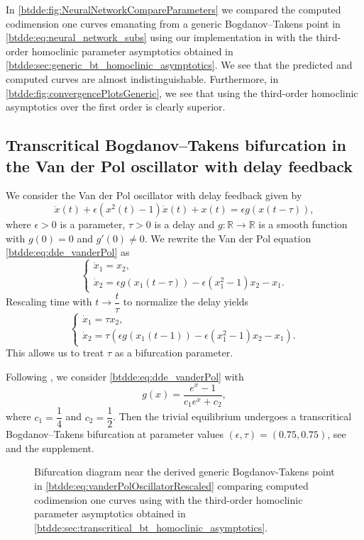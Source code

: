 In \cref{btdde:fig:NeuralNetworkCompareParameters} we compared the computed
codimension one curves emanating from a generic Bogdanov--Takens point in
\cref{btdde:eq:neural_network_subs} using our implementation in \DDEBIFTOOL with the
third-order homoclinic parameter asymptotics obtained in
\cref{btdde:sec:generic_bt_homoclinic_asymptotics}. We see that the predicted and
computed curves are almost indistinguishable. Furthermore, in
\cref{btdde:fig:convergencePlotsGeneric}, we see that using the third-order homoclinic
asymptotics over the first order is clearly superior.

\subsection{Transcritical Bogdanov--Takens bifurcation in the Van der Pol oscillator with delay feedback}
We consider the Van der Pol oscillator with delay feedback \cite{jiang2007bogdanov}
given by 
\begin{equation}
\label{btdde:eq:dde_vanderPol}
\ddot{x}(t) + \epsilon(x^2(t)-1)\dot{x}(t) + x(t) = \epsilon g(x(t-\tau)),
\end{equation}
where $\epsilon>0$ is a parameter, $\tau>0$ is a delay and $g:\mathbb{R}\rightarrow\mathbb{R}$
is a smooth function with $g(0) = 0$ and $g'(0)\neq0$. We rewrite
the Van der Pol equation \cref{btdde:eq:dde_vanderPol} as
\begin{equation}
\label{btdde:eq:vanderPolOscillator}
\begin{cases}
    \dot{x}_1 = x_2,\\
    \dot{x}_2 = \epsilon g(x_1(t-\tau))-\epsilon(x_1^2-1)x_2-x_1.
\end{cases}
\end{equation}
Rescaling time with $t\rightarrow\dfrac{t}{\tau}$ to normalize the
delay yields
\begin{equation}
\label{btdde:eq:vanderPolOscillatorRescaled}
\begin{cases}
\dot{x}_1 = \tau x_2,\\
\dot{x}_2 = \tau\left(\epsilon g(x_1(t-1))-\epsilon(x_1^2-1)x_2-x_1\right).
\end{cases}
\end{equation}
This allows us to treat $\tau$ as a bifurcation parameter.

Following \cite{jiang2007bogdanov}, we consider \cref{btdde:eq:dde_vanderPol} with
\[
g(x) = \frac{e^x-1}{c_1e^x + c_2},
\]
where $c_1 = \dfrac{1}{4}$ and $c_2 = \dfrac{1}{2}$. Then the trivial
equilibrium undergoes a transcritical Bogdanov--Takens bifurcation at parameter
values $(\epsilon,\tau) = (0.75,0.75)$, see \cite{jiang2007bogdanov} and the
supplement. 
%
\begin{figure}[ht]
    \centering
    \caption{Bifurcation diagram near the derived generic Bogdanov-Takens point in
        \cref{btdde:eq:vanderPolOscillatorRescaled} comparing computed codimension one curves using
        \DDEBIFTOOL with the third-order homoclinic parameter asymptotics obtained
        in \cref{btdde:sec:transcritical_bt_homoclinic_asymptotics}.}
    \label{btdde:fig:vanderPolOscillatorCompareParameters}
\end{figure}

